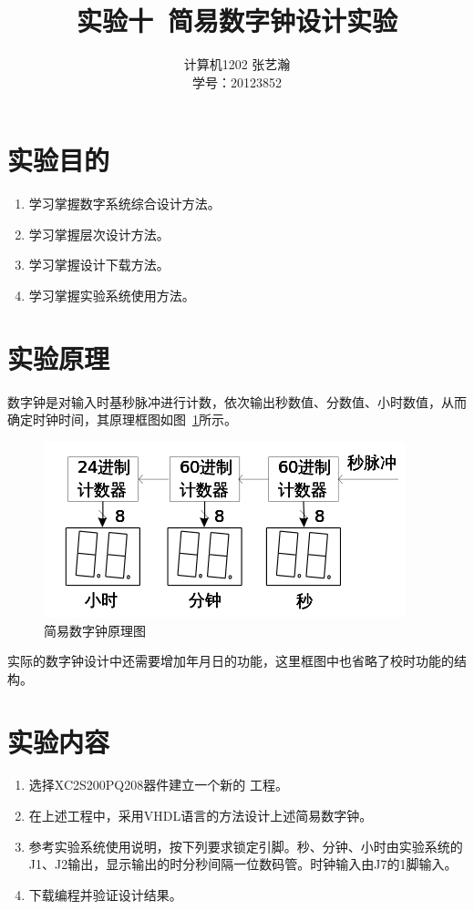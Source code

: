 \documentclass{article}
\begin{document}
\begin{CJK*}{UTF8}{gbsn}
\CJKtilde

\title{实验十\ 简易数字钟设计实验}

\author{计算机1202 张艺瀚\\学号：20123852}
\maketitle

\section{实验目的}
\begin{enumerate}
\item 学习掌握数字系统综合设计方法。
\item 学习掌握层次设计方法。
\item 学习掌握设计下载方法。
\item 学习掌握实验系统使用方法。
\end{enumerate}

\section{实验原理}
数字钟是对输入时基秒脉冲进行计数，依次输出秒数值、分数值、小时数值，从而确定时钟时间，其原理框图如图~\ref{fig: principle}所示。

\begin{center}
\begin{figure}[h!]
\includegraphics[width=\textwidth]{principle.jpg}
\caption{简易数字钟原理图}
\label{fig: principle}
\end{figure}
\end{center}

实际的数字钟设计中还需要增加年月日的功能，这里框图中也省略了校时功能的结构。

\section{实验内容}
\begin{enumerate}
\item 选择XC2S200PQ208器件建立一个新的 工程。
\item 在上述工程中，采用VHDL语言的方法设计上述简易数字钟。
\item 参考实验系统使用说明，按下列要求锁定引脚。秒、分钟、小时由实验系统的J1、J2输出，显示输出的时分秒间隔一位数码管。时钟输入由J7的1脚输入。
\item 下载编程并验证设计结果。
\end{enumerate}


\end{CJK*}
\end{document}
